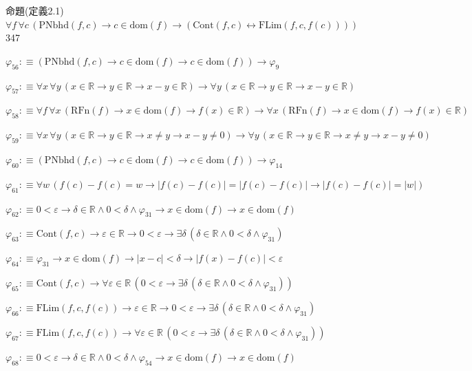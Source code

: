 \begin{fullproof}{命題(定義2.1)}{$\forall f\,\forall c\,(\mathrm{PNbhd}(f,c) \to c \in \mathrm{dom}(f) \to (\mathrm{Cont}(f,c) \leftrightarrow \mathrm{FLim}(f,c,f(c))))$}{347}
\begin{abbrevlist}
\item $\varphi_{56} :\equiv (\mathrm{PNbhd}(f,c) \to c \in \mathrm{dom}(f) \to c \in \mathrm{dom}(f)) \to \varphi_{9}$
\item $\varphi_{57} :\equiv \forall x\,\forall y\,(x \in \mathbb{R} \to y \in \mathbb{R} \to x - y \in \mathbb{R}) \to \forall y\,(x \in \mathbb{R} \to y \in \mathbb{R} \to x - y \in \mathbb{R})$
\item $\varphi_{58} :\equiv \forall f\,\forall x\,(\mathrm{RFn}(f) \to x \in \mathrm{dom}(f) \to f(x) \in \mathbb{R}) \to \forall x\,(\mathrm{RFn}(f) \to x \in \mathrm{dom}(f) \to f(x) \in \mathbb{R})$
\item $\varphi_{59} :\equiv \forall x\,\forall y\,(x \in \mathbb{R} \to y \in \mathbb{R} \to x \neq y \to x - y \neq 0) \to \forall y\,(x \in \mathbb{R} \to y \in \mathbb{R} \to x \neq y \to x - y \neq 0)$
\item $\varphi_{60} :\equiv (\mathrm{PNbhd}(f,c) \to c \in \mathrm{dom}(f) \to c \in \mathrm{dom}(f)) \to \varphi_{14}$
\item $\varphi_{61} :\equiv \forall w\,(f(c) - f(c) = w \to \lvert f(c) - f(c) \rvert = \lvert f(c) - f(c) \rvert \to \lvert f(c) - f(c) \rvert = \lvert w \rvert)$
\item $\varphi_{62} :\equiv 0 < \varepsilon \to \delta \in \mathbb{R} \land 0 < \delta \land \varphi_{31} \to x \in \mathrm{dom}(f) \to x \in \mathrm{dom}(f)$
\item $\varphi_{63} :\equiv \mathrm{Cont}(f,c) \to \varepsilon \in \mathbb{R} \to 0 < \varepsilon \to \exists \delta\,(\delta \in \mathbb{R} \land 0 < \delta \land \varphi_{31})$
\item $\varphi_{64} :\equiv \varphi_{31} \to x \in \mathrm{dom}(f) \to \lvert x - c \rvert < \delta \to \lvert f(x) - f(c) \rvert < \varepsilon$
\item $\varphi_{65} :\equiv \mathrm{Cont}(f,c) \to \forall \varepsilon \in \mathbb{R}\,(0 < \varepsilon \to \exists \delta\,(\delta \in \mathbb{R} \land 0 < \delta \land \varphi_{31}))$
\item $\varphi_{66} :\equiv \mathrm{FLim}(f,c,f(c)) \to \varepsilon \in \mathbb{R} \to 0 < \varepsilon \to \exists \delta\,(\delta \in \mathbb{R} \land 0 < \delta \land \varphi_{31})$
\item $\varphi_{67} :\equiv \mathrm{FLim}(f,c,f(c)) \to \forall \varepsilon \in \mathbb{R}\,(0 < \varepsilon \to \exists \delta\,(\delta \in \mathbb{R} \land 0 < \delta \land \varphi_{31}))$
\item $\varphi_{68} :\equiv 0 < \varepsilon \to \delta \in \mathbb{R} \land 0 < \delta \land \varphi_{54} \to x \in \mathrm{dom}(f) \to x \in \mathrm{dom}(f)$

\end{abbrevlist}
\end{fullproof}
